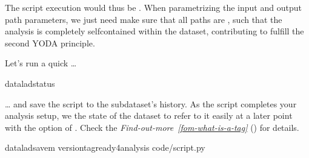 \sphinxAtStartPar
The script execution would thus be .
When parametrizing the input and output path parameters, we just need make sure that all paths  are , such that the  analysis is completely self\sphinxhyphen{}contained within the dataset, contributing to fulfill the second YODA principle.

\sphinxAtStartPar
Let’s run a quick …

\begin{sphinxVerbatim}[commandchars=\\\{\}]
dataladstatus
\end{sphinxVerbatim}

\ignorespaces 
\sphinxAtStartPar
… and save the script to the subdataset’s history. As the script completes your
analysis setup, we  the state of the dataset to refer to it easily at a later
point with the  option of . Check the
\textit{Find-out-more}~{\findoutmoreiconinline}\textit{\ref{fom-what-is-a-tag}} {\hyperref[\detokenize{basics/101-130-yodaproject:fom-what-is-a-tag}]{}} () for details.

\begin{sphinxVerbatim}[commandchars=\\\{\}]
dataladsave\PYGZhy{}m
\PYGZhy{}\PYGZhy{}version\PYGZhy{}tagready4analysis
code/script.py
\end{sphinxVerbatim}

